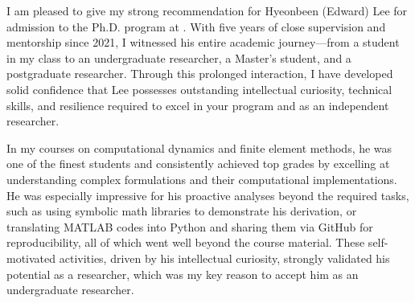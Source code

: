 


I am pleased to give my strong recommendation for Hyeonbeen (Edward) Lee for admission to the \Program{} Ph.D. program at \University{}. With five years of close supervision and mentorship since 2021, I witnessed his entire academic journey---from a student in my class to an undergraduate researcher, a Master's student, and a postgraduate researcher. Through this prolonged interaction, I have developed solid confidence that Lee possesses outstanding intellectual curiosity, technical skills, and resilience required to excel in your program and as an independent researcher.


In my courses on computational dynamics and finite element methods, he was one of the finest students and consistently achieved top grades by excelling at understanding complex formulations and their computational implementations. He was especially impressive for his proactive analyses beyond the required tasks, such as using symbolic math libraries to demonstrate his derivation, or translating MATLAB codes into Python and sharing them via GitHub for reproducibility, all of which went well beyond the course material. These self-motivated activities, driven by his intellectual curiosity, strongly validated his potential as a researcher, which was my key reason to accept him as an undergraduate researcher.


